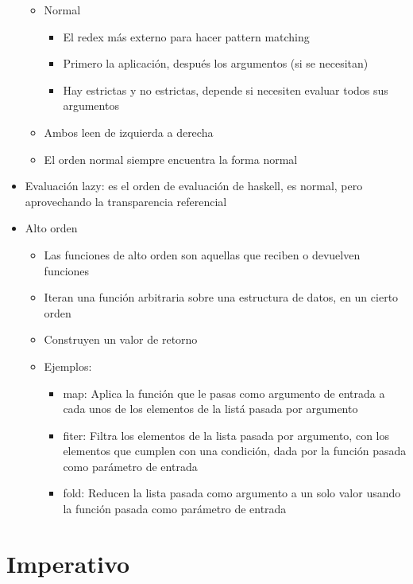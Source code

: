 \documentclass[a4paper,10pt]{article}
\begin{document}
\begin{itemize}
\begin{itemize}
	    \item Normal
	    \begin{itemize}
		\item El redex más externo para hacer pattern matching
		\item Primero la aplicación, después los argumentos (si se necesitan)
		\item Hay estrictas y no estrictas, depende si necesiten evaluar todos sus argumentos
	    \end{itemize}
	    \item Ambos leen de izquierda a derecha
	    \item El orden normal siempre encuentra la forma normal
	\end{itemize}
	\item Evaluación lazy: es el orden de evaluación de haskell, es normal, pero aprovechando la transparencia referencial
	\item Alto orden
	\begin{itemize}
	    \item Las funciones de alto orden son aquellas que reciben o devuelven funciones
	    \item Iteran una función arbitraria sobre una estructura de datos, en un cierto orden
	    \item Construyen un valor de retorno
	    \item Ejemplos:
	    \begin{itemize}
		\item map: Aplica la función que le pasas como argumento de entrada a cada unos de los elementos de la listá pasada por argumento
		\item fiter: Filtra los elementos de la lista pasada por argumento, con los elementos que cumplen con una condición, dada por la función pasada como parámetro de entrada
		\item fold: Reducen la lista pasada como argumento a un solo valor usando la función pasada como parámetro de entrada
	    \end{itemize} 
	\end{itemize}
    \end{itemize}
\section{Imperativo}
\end{document}
